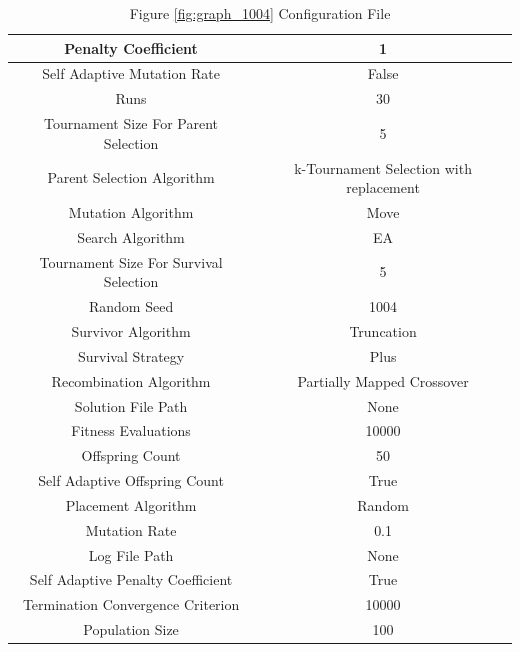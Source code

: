 \documentclass{standalone}
\begin{document}
\begin{table}[!htb]
	\centering
	\caption{Figure \ref{fig:graph_1004} Configuration File}
	\label{tab:graph_1004}
	\begin{tabular}{| c | c |}
		\hline
		Penalty Coefficient		& 1		 \\
		\hline
		Self Adaptive Mutation Rate		& False		 \\
		\hline
		Runs		& 30		 \\
		\hline
		Tournament Size For Parent Selection		& 5		 \\
		\hline
		Parent Selection Algorithm		& k-Tournament Selection with replacement		 \\
		\hline
		Mutation Algorithm		& Move		 \\
		\hline
		Search Algorithm		& EA		 \\
		\hline
		Tournament Size For Survival Selection		& 5		 \\
		\hline
		Random Seed		& 1004		 \\
		\hline
		Survivor Algorithm		& Truncation		 \\
		\hline
		Survival Strategy		& Plus		 \\
		\hline
		Recombination Algorithm		& Partially Mapped Crossover		 \\
		\hline
		Solution File Path		& None		 \\
		\hline
		Fitness Evaluations		& 10000		 \\
		\hline
		Offspring Count		& 50		 \\
		\hline
		Self Adaptive Offspring Count		& True		 \\
		\hline
		Placement Algorithm		& Random		 \\
		\hline
		Mutation Rate		& 0.1		 \\
		\hline
		Log File Path		& None		 \\
		\hline
		Self Adaptive Penalty Coefficient		& True		 \\
		\hline
		Termination Convergence Criterion		& 10000		 \\
		\hline
		Population Size		& 100		 \\
		\hline
	\end{tabular}
\end{table}
\end{document}

